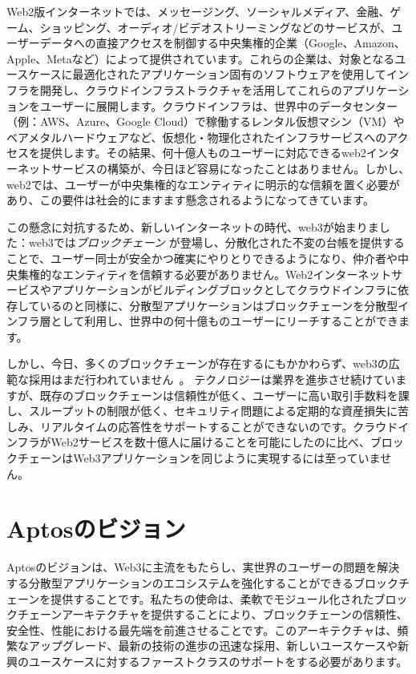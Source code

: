 \documentclass{article}
\begin{document}
Web2版インターネットでは、メッセージング、ソーシャルメディア、金融、ゲーム、ショッピング、オーディオ/ビデオストリーミングなどのサービスが、ユーザーデータへの直接アクセスを制御する中央集権的企業（Google、Amazon、Apple、Metaなど）によって提供されています。これらの企業は、対象となるユースケースに最適化されたアプリケーション固有のソフトウェアを使用してインフラを開発し、クラウドインフラストラクチャを活用してこれらのアプリケーションをユーザーに展開します。クラウドインフラは、世界中のデータセンター（例：AWS、Azure、Google Cloud）で稼働するレンタル仮想マシン（VM）やベアメタルハードウェアなど、仮想化・物理化されたインフラサービスへのアクセスを提供します。その結果、何十億人ものユーザーに対応できるweb2インターネットサービスの構築が、今日ほど容易になったことはありません。しかし、web2では、ユーザーが中央集権的なエンティティに明示的な信頼を置く必要があり、この要件は社会的にますます懸念されるようになってきています。

この懸念に対抗するため、新しいインターネットの時代、web3が始まりました：web3では\emph{ブロックチェーン} が登場し、分散化された不変の台帳を提供することで、ユーザー同士が安全かつ確実にやりとりできるようになり、仲介者や中央集権的なエンティティを信頼する必要がありません。Web2インターネットサービスやアプリケーションがビルディングブロックとしてクラウドインフラに依存しているのと同様に、分散型アプリケーションはブロックチェーンを分散型インフラ層として利用し、世界中の何十億ものユーザーにリーチすることができます。

しかし、今日、多くのブロックチェーンが存在するにもかかわらず、web3の広範な採用はまだ行われていません~\cite{a16_state}。 テクノロジーは業界を進歩させ続けていますが、既存のブロックチェーンは信頼性が低く、ユーザーに高い取引手数料を課し、スループットの制限が低く、セキュリティ問題による定期的な資産損失に苦しみ、リアルタイムの応答性をサポートすることができないのです。クラウドインフラがWeb2サービスを数十億人に届けることを可能にしたのに比べ、ブロックチェーンはWeb3アプリケーションを同じように実現するには至っていません。

\section{Aptosのビジョン}
\label{sec:aptos_vision}

Aptosのビジョンは、Web3に主流をもたらし、実世界のユーザーの問題を解決する分散型アプリケーションのエコシステムを強化することができるブロックチェーンを提供することです。私たちの使命は、柔軟でモジュール化されたブロックチェーンアーキテクチャを提供することにより、ブロックチェーンの信頼性、安全性、性能における最先端を前進させることです。このアーキテクチャは、頻繁なアップグレード、最新の技術の進歩の迅速な採用、新しいユースケースや新興のユースケースに対するファーストクラスのサポートをする必要があります。
\end{document}
